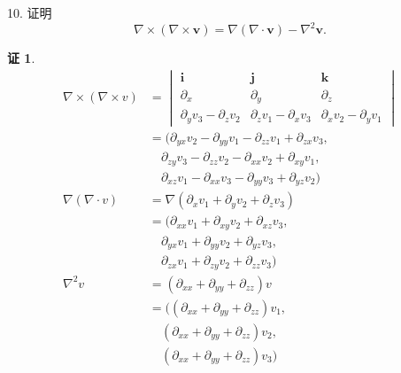 \documentclass[a4paper,12pt]{article}
\theoremstyle{definition}
\newtheorem*{pf}{证}
\begin{document}
10. 证明
$$
    \nabla\times(\nabla\times\boldsymbol{v})=\nabla(\nabla\cdot\boldsymbol{v})-\nabla^2\boldsymbol{v}.
$$
\begin{pf}
    \begin{align*}
        \nabla\times(\nabla\times v)
         & =\begin{vmatrix}
                \boldsymbol{i}                  & \boldsymbol{j}                  & \boldsymbol{k}                  \\
                \partial_x                      & \partial_y                      & \partial_z                      \\
                \partial_y v_3 - \partial_z v_2 & \partial_z v_1 - \partial_x v_3 & \partial_x v_2 - \partial_y v_1
            \end{vmatrix} \\
         & =(\partial_{yx}v_2-\partial_{yy}v_1-\partial_{zz}v_1+\partial_{zx}v_3,                               \\
         & \quad\partial_{zy}v_3-\partial_{zz}v_2-\partial_{xx}v_2+\partial_{xy}v_1,                            \\
         & \quad\partial_{xz}v_1-\partial_{xx}v_3-\partial_{yy}v_3+\partial_{yz}v_2)                            \\
        \nabla(\nabla\cdot v)
         & =\nabla(\partial_x v_1 + \partial_y v_2 + \partial_z v_3)                                            \\
         & =(\partial_{xx}v_1 + \partial_{xy}v_2 + \partial_{xz}v_3,                                            \\
         & \quad\partial_{yx}v_1 + \partial_{yy}v_2 + \partial_{yz}v_3,                                         \\
         & \quad\partial_{zx}v_1 + \partial_{zy}v_2 + \partial_{zz}v_3)                                         \\
        \nabla^2v
         & =(\partial_{xx}+\partial_{yy}+\partial_{zz})v                                                        \\
         & =((\partial_{xx}+\partial_{yy}+\partial_{zz})v_1,                                                    \\
         & \quad(\partial_{xx}+\partial_{yy}+\partial_{zz})v_2,                                                 \\
         & \quad(\partial_{xx}+\partial_{yy}+\partial_{zz})v_3)
    \end{align*}


\end{pf}
\end{document}

